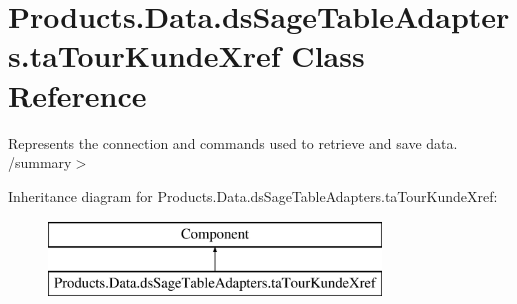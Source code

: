 \hypertarget{class_products_1_1_data_1_1ds_sage_table_adapters_1_1ta_tour_kunde_xref}{}\section{Products.\+Data.\+ds\+Sage\+Table\+Adapters.\+ta\+Tour\+Kunde\+Xref Class Reference}
\label{class_products_1_1_data_1_1ds_sage_table_adapters_1_1ta_tour_kunde_xref}


Represents the connection and commands used to retrieve and save data. /summary$>$  


Inheritance diagram for Products.\+Data.\+ds\+Sage\+Table\+Adapters.\+ta\+Tour\+Kunde\+Xref\+:\begin{figure}[H]
\begin{center}
\leavevmode
\includegraphics[height=2.000000cm]{class_products_1_1_data_1_1ds_sage_table_adapters_1_1ta_tour_kunde_xref}
\end{center}
\end{figure}
